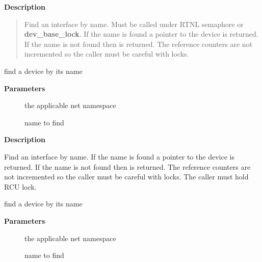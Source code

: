 \documentclass[a4paper,8pt,english]{sphinxmanual}
\begin{document}
\textbf{Description}
\begin{quote}

Find an interface by name. Must be called under RTNL semaphore
or \textbf{dev\_base\_lock}. If the name is found a pointer to the device
is returned. If the name is not found then  is returned. The
reference counters are not incremented so the caller must be
careful with locks.
\end{quote}

\begin{fulllineitems}
\label{networking/kapi:c.dev_get_by_name_rcu}
find a device by its name

\end{fulllineitems}


\textbf{Parameters}
\begin{description}
\item[{}] \leavevmode
the applicable net namespace

\item[{}] \leavevmode
name to find

\end{description}

\textbf{Description}

Find an interface by name.
If the name is found a pointer to the device is returned.
If the name is not found then  is returned.
The reference counters are not incremented so the caller must be
careful with locks. The caller must hold RCU lock.

\begin{fulllineitems}
\label{networking/kapi:c.dev_get_by_name}
find a device by its name

\end{fulllineitems}


\textbf{Parameters}
\begin{description}
\item[{}] \leavevmode
the applicable net namespace

\item[{}] \leavevmode
name to find

\end{description}
\end{document}
